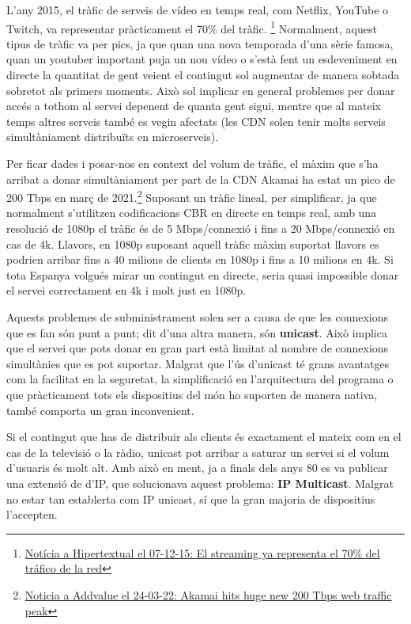 {    L'any 2015, el tràfic de serveis de vídeo en temps real, com Netflix, YouTube o Twitch, va representar pràcticament el 70\% del tràfic.
    \footnote{\href{https://hipertextual.com/2015/12/streaming-netflix-ancho-banda}{Notícia a Hipertextual el 07-12-15: El streaming ya representa el 70\% del tráfico de la red}}
    Normalment, aquest tipus de tràfic va per pics, ja que quan una nova temporada d'una sèrie famosa, quan un youtuber important puja un nou vídeo o s'està
    fent un esdeveniment en directe la quantitat de gent veient el contingut sol augmentar de manera sobtada sobretot als primers moments. Això sol implicar
    en general problemes per donar accés a tothom al servei depenent de quanta gent sigui, mentre que al mateix temps altres serveis també es vegin
    afectats (les \ac{CDN} solen tenir molts serveis simultàniament distribuïts en microserveis).
    
    \newpage

    Per ficar dades i posar-nos en context del volum de tràfic, el màxim que s'ha arribat a donar simultàniament per part de la \ac{CDN} Akamai
    ha estat un pico de 200 Tbps en març de 2021.\footnote{\href{https://addvalue.com.br/novo/artigos/akamai-hits-huge-new-200-tbps/}{Noticia a Addvalue el 24-03-22: Akamai hits huge new 200 Tbps web traffic peak}}
    Suposant un tràfic lineal, per simplificar, ja que normalment s'utilitzen codificacions \ac{CBR}
    en directe en temps real, amb una resolució de 1080p el tràfic és de 5 Mbps/connexió i fins a 20 Mbps/connexió en cas de 4k. Llavors, en 1080p
    suposant aquell tràfic màxim suportat llavors es podrien arribar fins a 40 milions de clients en 1080p i fins a 10 milions en 4k. Si tota
    Espanya volgués mirar un contingut en directe, seria quasi impossible donar el servei correctament en 4k i molt just en 1080p.
    
    Aquests problemes de subministrament solen ser a causa de que les connexions que es fan són punt a punt; dit d'una altra manera,
    són \textbf{unicast}. Això implica que el servei que pots donar en gran part està limitat al nombre de connexions simultànies que es pot suportar. Malgrat que
    l'ús d'unicast té grans avantatges com la facilitat en la seguretat, la simplificació en l'arquitectura del programa o que pràcticament tots els
    dispositius del món ho suporten de manera nativa, també comporta un gran inconvenient.
    
    Si el contingut que has de distribuir als clients és exactament el mateix com en el cas de la televisió o la ràdio, unicast pot arribar a saturar
    un servei si el volum d'usuaris és molt alt. Amb això en ment, ja a finals dels anys 80 es va publicar una extensió de d'\ac{IP}, \cite{RFC 988} que solucionava
    aquest problema: \textbf{IP Multicast}. Malgrat no estar tan establerta com IP unicast, sí que la gran majoria de dispositius l'accepten.
    
}
